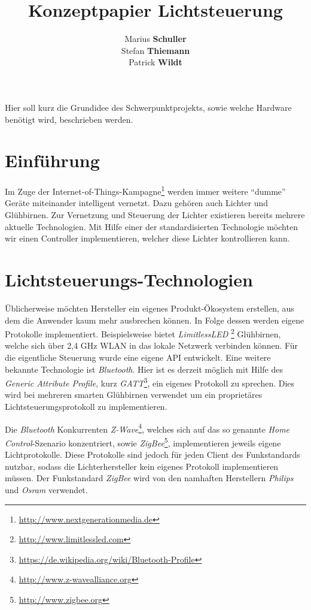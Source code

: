 \documentclass[a4paper,12pt]{article}
\begin{document}
\title{Konzeptpapier Lichtsteuerung}
\author{Marius \textbf{Schuller}\\
        Stefan \textbf{Thiemann}\\
		Patrick \textbf{Wildt}}
\maketitle

\tableofcontents

\newpage

\noindent
Hier soll kurz die Grundidee des Schwerpunktprojekts, sowie welche Hardware 
benötigt wird, beschrieben werden.

\section{Einführung}

Im Zuge der Internet-of-Things-Kampagne\footnote{\url{http://www.nextgenerationmedia.de}}
werden immer weitere ``dumme'' Geräte miteinander intelligent vernetzt. Dazu
gehören auch Lichter und Glühbirnen. Zur Vernetzung und Steuerung der Lichter
existieren bereits mehrere aktuelle Technologien. Mit Hilfe einer der
standardisierten Technologie möchten wir einen Controller implementieren,
welcher diese Lichter kontrollieren kann.

\section{Lichtsteuerungs-Technologien}

Üblicherweise möchten Hersteller ein eigenes Produkt-Ökosystem erstellen, aus dem die
Anwender kaum mehr ausbrechen können. In Folge dessen werden eigene Protokolle
implementiert. Beispielsweise bietet \textit{LimitlessLED}
\footnote{\url{http://www.limitlessled.com}} Glühbirnen, welche sich
über 2,4 GHz WLAN in das lokale Netzwerk verbinden können. Für die eigentliche
Steuerung wurde eine eigene API entwickelt. Eine weitere bekannte Technologie ist
\textit{Bluetooth}. Hier ist es derzeit möglich mit Hilfe des \textit{Generic
Attribute Profile}, kurz
\textit{GATT}\footnote{\url{https://de.wikipedia.org/wiki/Bluetooth-Profile}},
ein eigenes Protokoll zu sprechen. Dies wird bei mehreren smarten Glühbirnen
verwendet um ein proprietäres Lichtsteuerungsprotokoll zu implementieren.

\newpage

Die \textit{Bluetooth} Konkurrenten
\textit{Z-Wave}\footnote{\url{http://www.z-wavealliance.org}}, welches sich auf das
so genannte \textit{Home Control}-Szenario konzentriert, sowie
\textit{ZigBee}\footnote{\url{http://www.zigbee.org}},
implementieren jeweils eigene Lichtprotokolle. Diese Protokolle sind jedoch für jeden
Client des Funkstandards nutzbar, sodass die Lichterhersteller kein eigenes Protokoll
implementieren müssen. Der Funkstandard \textit{ZigBee} wird von den namhaften
Herstellern \textit{Philips} und \textit{Osram} verwendet.
\end{document}
